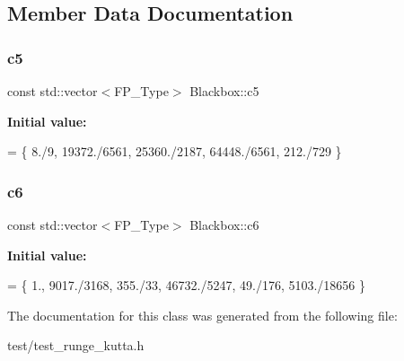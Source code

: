 \subsection{Member Data Documentation}
\mbox{\label{classBlackbox_a1bb02f77d852c89644c3b21b0c5f528a}} 
\subsubsection{\texorpdfstring{c5}{c5}}
{\footnotesize\ttfamily const std\+::vector$<$F\+P\+\_\+\+Type$>$ Blackbox\+::c5}

{\bfseries Initial value\+:}
\begin{DoxyCode}
= \{ 8./9, 19372./6561, 25360./2187,
                                    64448./6561, 212./729 \}
\end{DoxyCode}
\mbox{\label{classBlackbox_aabd96578c54a99b68683fd0114ed5610}} 
\subsubsection{\texorpdfstring{c6}{c6}}
{\footnotesize\ttfamily const std\+::vector$<$F\+P\+\_\+\+Type$>$ Blackbox\+::c6}

{\bfseries Initial value\+:}
\begin{DoxyCode}
= \{ 1., 9017./3168, 355./33,
                                    46732./5247, 49./176, 5103./18656 \}
\end{DoxyCode}


The documentation for this class was generated from the following file\+:\begin{DoxyCompactItemize}
\item 
test/test\+\_\+runge\+\_\+kutta.\+h\end{DoxyCompactItemize}
